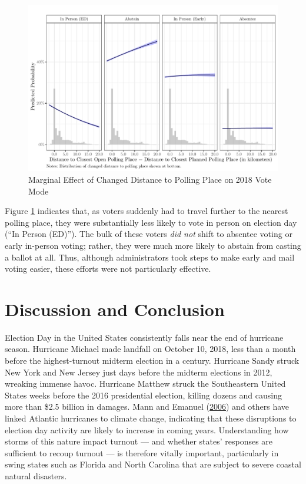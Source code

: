 \documentclass[
  12pt,
]{article}
\begin{document}
\begin{figure}[H]

{\centering \includegraphics{hurricane_michael_files/figure-latex/marg-multi-1} 

}

\caption{\label{fig:marg-multi}Marginal Effect of Changed Distance to Polling Place on 2018 Vote Mode}\label{fig:marg-multi}
\end{figure}

Figure \ref{fig:marg-multi} indicates that, as voters suddenly had to travel further to the nearest polling place, they were substantially less likely to vote in person on election day (``In Person (ED)''). The bulk of these voters \emph{did not} shift to absentee voting or early in-person voting; rather, they were much more likely to abstain from casting a ballot at all. Thus, although administrators took steps to make early and mail voting easier, these efforts were not particularly effective.

\hypertarget{discussion-and-conclusion}{%
\section*{Discussion and Conclusion}\label{discussion-and-conclusion}}

Election Day in the United States consistently falls near the end of hurricane season. Hurricane Michael made landfall on October 10, 2018, less than a month before the highest-turnout midterm election in a century. Hurricane Sandy struck New York and New Jersey just days before the midterm elections in 2012, wreaking immense havoc. Hurricane Matthew struck the Southeastern United States weeks before the 2016 presidential election, killing dozens and causing more than \$2.5 billion in damages. Mann and Emanuel (\protect\hyperlink{ref-Mann2006}{2006}) and others have linked Atlantic hurricanes to climate change, indicating that these disruptions to election day activity are likely to increase in coming years. Understanding how storms of this nature impact turnout --- and whether states' responses are sufficient to recoup turnout --- is therefore vitally important, particularly in swing states such as Florida and North Carolina that are subject to severe coastal natural disasters.
\end{document}
